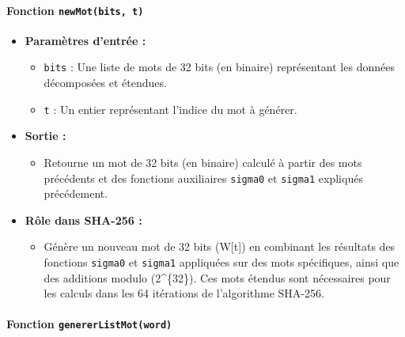 \documentclass[11pt]{article}
\providecommand{\tightlist}{%
      \setlength{\itemsep}{0pt}\setlength{\parskip}{0pt}}
\begin{document}
    \paragraph{\texorpdfstring{Fonction
\texttt{newMot(bits,\ t)}}{Fonction newMot(bits, t)}}\label{fonction-newmotbits-t}

\begin{itemize}
\tightlist
\item
  \textbf{Paramètres d'entrée :}

  \begin{itemize}
  \tightlist
  \item
    \texttt{bits} : Une liste de mots de 32 bits (en binaire)
    représentant les données décomposées et étendues.
  \item
    \texttt{t} : Un entier représentant l'indice du mot à générer.
  \end{itemize}
\item
  \textbf{Sortie :}

  \begin{itemize}
  \tightlist
  \item
    Retourne un mot de 32 bits (en binaire) calculé à partir des mots
    précédents et des fonctions auxiliaires \texttt{sigma0} et
    \texttt{sigma1} expliqués précédement.
  \end{itemize}
\item
  \textbf{Rôle dans SHA-256 :}

  \begin{itemize}
  \tightlist
  \item
    Génère un nouveau mot de 32 bits (W{[}t{]}) en combinant les
    résultats des fonctions \texttt{sigma0} et \texttt{sigma1}
    appliquées sur des mots spécifiques, ainsi que des additions modulo
    (2\^{}\{32\}). Ces mots étendus sont nécessaires pour les calculs
    dans les 64 itérations de l'algorithme SHA-256.
  \end{itemize}
\end{itemize}

\paragraph{\texorpdfstring{Fonction
\texttt{genererListMot(word)}}{Fonction genererListMot(word)}}\label{fonction-genererlistmotword}
\end{document}

